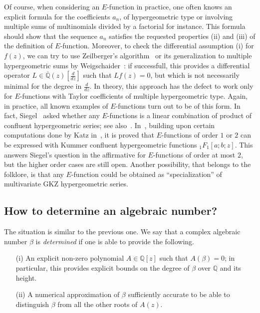 \documentclass[reqno,english,12pt,a4paper]{smfart}
\numberwithin{equation}{section}
\def\Qbar{\overline{\mathbb Q}}
\begin{document}
\medskip

Of course, when considering an $E$-function  in practice, one often knows an explicit formula for the 
coefficients $a_n$, of hypergeometric type or involving multiple sums of multinomials divided 
by a factorial for instance. This formula should show that the sequence $a_n$ satisfies the requested properties 
(ii) and (iii) of the definition of $E$-function. Moreover, to check the differential assumption (i) for $f(z)$, 
we can try to use Zeilberger's algorithm~\cite[Chapter 7]{koepf} or its generalization to multiple 
hypergeometric sums by Weigschaider~\cite{weig}: if successfull, this provides a differential operator 
$L\in \Qbar(z)[\frac{d}{dz}]$ such that $Lf(z)=0$, but which is not necessarily minimal for the degree 
in $\frac{d}{dz}$. In theory, this approach has the defect to work only for $E$-functions with Taylor 
coefficients of multiple hypergeometric type. Again, in practice, all known examples of $E$-functions 
turn out to be of this form. In fact, Siegel~\cite{sieg} asked whether any $E$-functions 
is a linear combination of product of confluent hypergeometric series; see also~\cite[p. 184]{shid}. 
In~\cite{rivroq}, building upon certain computations done by Katz in~\cite{katz}, it is proved that 
$E$-functions of order $1$ or $2$ can be expressed with Kummer confluent hypergeometric functions  
${}_1F_1[a;b;z]$. This  answers Siegel's question in the affirmative for $E$-functions of order at most $2$, 
but the higher order cases are still open. Another possibility, that belongs to the folklore, is that any 
$E$-function could be obtained as ``specialization'' of multivariate GKZ hypergeometric series.

\subsection{How to determine an algebraic number?}

The situation is similar to the previous one.  
We say that a complex algebraic number  $\beta$ is {\em determined} if one is able to provide 
the following.    
\begin{itemize}
\item [(i)] An explicit non-zero polynomial $A\in \mathbb Q[z]$ such that $A(\beta)=0$;  
in particular, this provides explicit bounds on the degree of $\beta$ over $\mathbb Q$ and its height.
\item [(ii)] A numerical approximation of $\beta$ sufficiently accurate to be able to distinguish 
 $\beta$ from all the other roots of $A(z)$.
\end{itemize}
\end{document}
